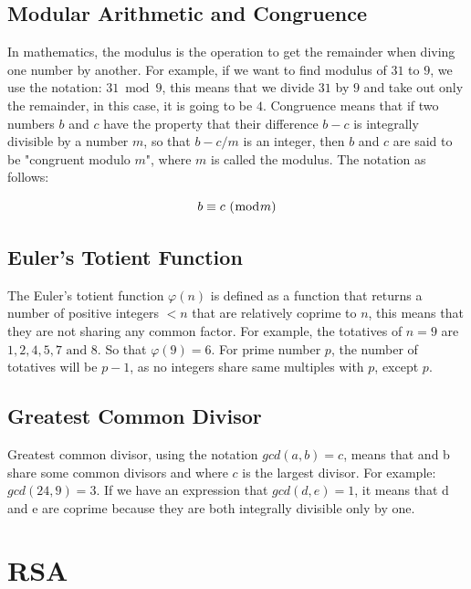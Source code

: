 \documentclass[a4paper, 12pt]{article}
\begin{document}
\subsection{Modular Arithmetic and Congruence}
\label{bsec:mod}

In mathematics, the modulus is the operation to get the remainder when diving one number by
another. For example, if we want to find modulus of $31$ to $9$, we use the notation: $31\bmod9$, this
means that we divide $31$ by $9$ and take out only the remainder, in this case, it is going to be $4$.
Congruence means that if two numbers $b$ and $c$ have the property that their difference $b - c$ is
integrally divisible by a number $m$, so that $b - c/m$ is an integer, then $b$ and $c$ are said to be
"congruent modulo $m$", where $m$ is called the modulus. The notation as follows:

\begin{equation*}
  b \equiv c \text{ } (\bmod m)\\
  \end{equation*}

\subsection{Euler's Totient Function}
\label{bsec:euler}

The Euler's totient function $\varphi(n)$ is defined as a function that returns a number of positive integers
$<n$ that are relatively coprime to $n$, this means that they are not sharing any common factor. For
example, the totatives of $n = 9$ are $1, 2, 4, 5, 7 \text{ and } 8$. So that $\varphi(9) = 6$. For prime number $p$, the
number of totatives will be $p - 1$, as no integers share same multiples with $p$, except $p$.

\subsection{Greatest Common Divisor}
\label{bsec:gcd}

Greatest common divisor, using the notation $gcd(a,b)=c$, means that and b share some common
divisors and where $c$ is the largest divisor. For example: $gcd(24,9)=3$. If we have an
expression that $gcd(d,e)=1$, it means that d and e are coprime because they are both integrally
divisible only by one.

\section{RSA}
\label{sec:rsa}
\end{document}
